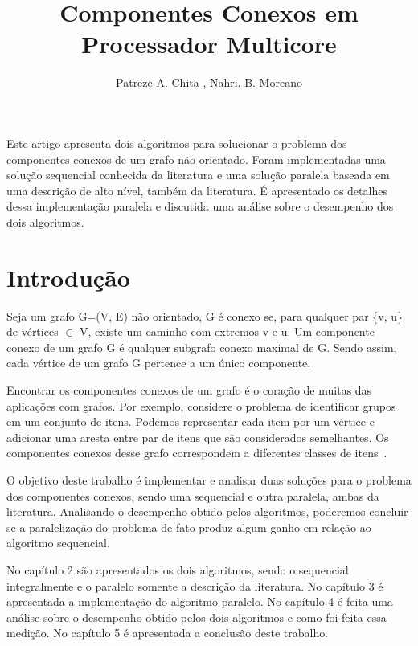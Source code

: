 \documentclass[12pt]{article}
\title{Componentes Conexos em Processador Multicore}
\author{Patreze A. Chita \inst{1}, Nahri. B. Moreano\inst{1}}
\begin{document}
 

\maketitle
     
\begin{resumo} 
Este artigo apresenta dois algoritmos para solucionar o problema dos componentes conexos de um grafo não orientado. Foram implementadas uma solução sequencial conhecida da literatura e uma solução paralela baseada em uma descrição de alto nível, também da literatura. É apresentado os detalhes dessa implementação paralela e discutida uma análise sobre o desempenho dos dois algoritmos.
\end{resumo}

\section{Introdução}
Seja um grafo G=(V, E) não orientado, G é conexo se, para qualquer par \{v, u\} de vértices $\in$ V, existe um caminho com extremos v e u. Um componente conexo de um grafo G é qualquer subgrafo conexo maximal de G. Sendo assim, cada vértice de um grafo G pertence a um único componente.

Encontrar os componentes conexos de um grafo é o coração de muitas das aplicações com grafos. Por exemplo, considere o problema de identificar grupos em um conjunto de itens. Podemos representar cada item por um vértice e adicionar uma aresta entre par de itens que são considerados semelhantes. Os componentes conexos desse grafo correspondem a diferentes classes de itens~\cite{Skiena:2008}.

O objetivo deste trabalho é implementar e analisar duas soluções para o problema dos componentes conexos, sendo uma sequencial e outra paralela, ambas da literatura. Analisando o desempenho obtido pelos algoritmos, poderemos concluir se a paralelização do problema de fato produz algum ganho em relação ao algoritmo sequencial.

No capítulo 2 são apresentados os dois algoritmos, sendo o sequencial integralmente e o paralelo somente a descrição da literatura. No capítulo 3 é apresentada a implementação do algoritmo paralelo. No capítulo 4 é feita uma análise sobre o desempenho obtido pelos dois algoritmos e como foi feita essa medição. No capítulo 5 é apresentada a conclusão deste trabalho.
\end{document}
